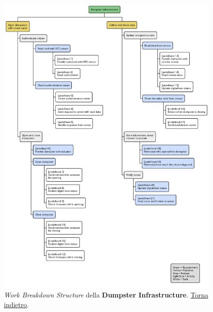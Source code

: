 \begin{figure}[H]
    \centering
    \includegraphics[width=\textwidth]{img/wbs-dumpster-infrastructure.pm}
    \caption{\textit{Work Breakdown Structure} della \textbf{Dumpster Infrastructure}. \hyperlink{back:wbs-dumpster-infrastructure}{Torna indietro}.}
    \label{fig:wbs-dumpster-infrastructure}
\end{figure}

